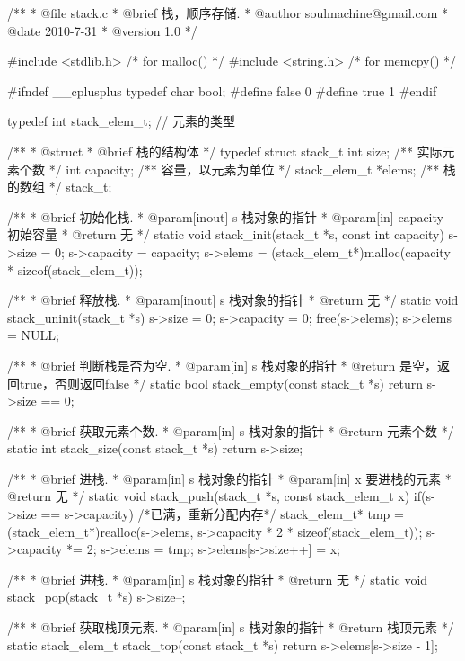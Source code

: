 \begin{Codex}[label=stack.c]
/** 
 * @file stack.c
 * @brief 栈，顺序存储.
 * @author soulmachine@gmail.com
 * @date 2010-7-31
 * @version 1.0
 */

#include <stdlib.h>  /* for malloc() */
#include <string.h>  /* for memcpy() */

#ifndef __cplusplus 
typedef char bool;
#define false 0
#define true 1
#endif

typedef int stack_elem_t; // 元素的类型

/**
 * @struct
 * @brief 栈的结构体
 */
typedef struct stack_t {
    int     size;  /** 实际元素个数 */
    int     capacity; /** 容量，以元素为单位 */
    stack_elem_t  *elems;   /** 栈的数组 */
}stack_t;

/** 
 * @brief 初始化栈.
 * @param[inout] s 栈对象的指针
 * @param[in] capacity 初始容量
 * @return 无
 */
static void stack_init(stack_t *s, const int capacity) {
    s->size = 0;
    s->capacity = capacity;
    s->elems = (stack_elem_t*)malloc(capacity * sizeof(stack_elem_t));
}

/** 
 * @brief 释放栈.
 * @param[inout] s 栈对象的指针
 * @return 无
 */
static void stack_uninit(stack_t *s) {
    s->size = 0;
    s->capacity = 0;
    free(s->elems);
    s->elems = NULL;
}

/** 
 * @brief 判断栈是否为空.
 * @param[in] s 栈对象的指针
 * @return 是空，返回true，否则返回false
 */
static bool stack_empty(const stack_t *s) {
    return s->size == 0;
}

/** 
 * @brief 获取元素个数.
 * @param[in] s 栈对象的指针
 * @return 元素个数
 */
static int stack_size(const stack_t *s) {
    return s->size;
}

/** 
 * @brief 进栈.
 * @param[in] s 栈对象的指针
 * @param[in] x 要进栈的元素
 * @return 无
 */
static void stack_push(stack_t *s, const stack_elem_t x)
{
    if(s->size == s->capacity) { /*已满，重新分配内存*/
        stack_elem_t* tmp = (stack_elem_t*)realloc(s->elems, 
            s->capacity * 2 * sizeof(stack_elem_t));
        s->capacity *= 2;
        s->elems = tmp;
    }
    s->elems[s->size++] = x;
}

/** 
 * @brief 进栈.
 * @param[in] s 栈对象的指针
 * @return 无
 */
static void stack_pop(stack_t *s) {
    s->size--;
}

/** 
 * @brief 获取栈顶元素.
 * @param[in] s 栈对象的指针
 * @return 栈顶元素
 */
static stack_elem_t stack_top(const stack_t *s) {
    return s->elems[s->size - 1];
}
\end{Codex}

